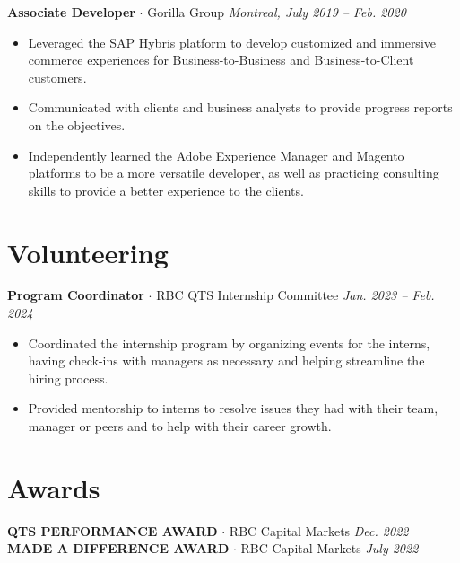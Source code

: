 \documentclass[a4paper,10pt]{article}
\newcommand{\jobentry}[4]{
    \noindent
    \textbf{\large#3}{ $\cdot$ }{#1} \hfill \textit{#2, #4}
    \vspace{-0.5em} %
}
\begin{document}
\vspace{0.4em}
\jobentry{Gorilla Group}{Montreal}{Associate Developer}{July 2019 – Feb. 2020}
\begin{itemize}[left=0em]
    \item Leveraged the SAP Hybris platform to develop customized and immersive commerce experiences for Business-to-Business and Business-to-Client customers.
    \item Communicated with clients and business analysts to provide progress reports on the objectives.
    \item Independently learned the Adobe Experience Manager and Magento platforms to be a more versatile developer, as well as practicing consulting skills to provide a better experience to the clients.
\end{itemize}

\vspace{-0.2cm}
\section*{Volunteering}
\noindent
\textbf{Program Coordinator}  {$\bm{\cdot}$}  RBC QTS  Internship Committee \hfill \textit{Jan. 2023 – Feb. 2024}
\vspace{-0.5em}
\begin{itemize}[left=0em]
    \item Coordinated the internship program by organizing events for the interns, having check-ins with managers as necessary and helping streamline the hiring process.
    \item Provided mentorship to interns to resolve issues they had with their team, manager or peers and to help with their career growth.
\end{itemize}
\vspace{-0.2cm}
\section*{Awards}
\noindent
\textbf{QTS PERFORMANCE AWARD} {$\bm{\cdot}$} RBC Capital Markets \hfill \textit{Dec. 2022} \\
\textbf{MADE A DIFFERENCE AWARD} {$\bm{\cdot}$} RBC Capital Markets \hfill \textit{July 2022} \\
\end{document}
